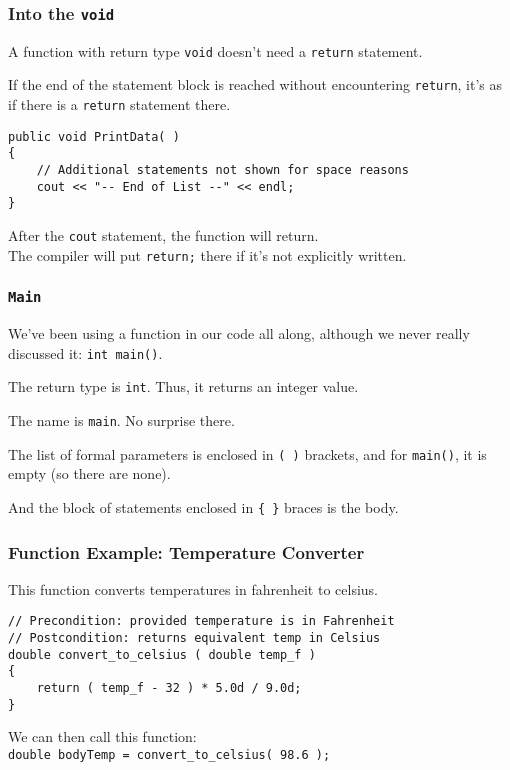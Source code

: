 \begin{frame}[fragile]
\frametitle{Into the \texttt{void}}

A function with return type \texttt{void} doesn't need a \texttt{return} statement.

If the end of the statement block is reached without encountering \texttt{return}, it's as if there is a \texttt{return} statement there.

\begin{verbatim}
public void PrintData( )
{
    // Additional statements not shown for space reasons
    cout << "-- End of List --" << endl;
}
\end{verbatim}

After the \texttt{cout} statement, the function will return.\\
\quad The compiler will put \texttt{return;} there if it's not explicitly written.

\end{frame}


\begin{frame}
\frametitle{\texttt{Main}}

We've been using a function in our code all along, although we never really discussed it: \texttt{int main()}.

The return type is \texttt{int}. Thus, it returns an integer value.

The name is \texttt{main}. No surprise there.

The list of formal parameters is enclosed in \texttt{( )} brackets, and for \texttt{main()}, it is empty (so there are none).

And the block of statements enclosed in \texttt{\{ \}} braces is the body.

\end{frame}

\begin{frame}[fragile]
\frametitle{Function Example: Temperature Converter}

This function converts temperatures in fahrenheit to celsius.

\begin{verbatim}
// Precondition: provided temperature is in Fahrenheit
// Postcondition: returns equivalent temp in Celsius
double convert_to_celsius ( double temp_f )
{
    return ( temp_f - 32 ) * 5.0d / 9.0d;
}
\end{verbatim}

We can then call this function:\\
\quad \texttt{double bodyTemp = convert\_to\_celsius( 98.6 );}

\end{frame}

